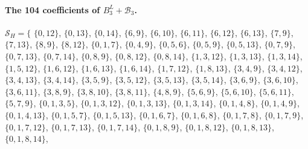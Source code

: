 \paragraph{The 104 coefficients of $B_3^L+\mathcal B_3$.}
\begingroup\small\raggedright
\noindent\(\mathcal S_H=\{\)
\(\{0,12\}\),\allowbreak\space
\(\{0,13\}\),\allowbreak\space
\(\{0,14\}\),\allowbreak\space
\(\{6,9\}\),\allowbreak\space
\(\{6,10\}\),\allowbreak\space
\(\{6,11\}\),\allowbreak\space
\(\{6,12\}\),\allowbreak\space
\(\{6,13\}\),\allowbreak\space
\(\{7,9\}\),\allowbreak\space
\(\{7,13\}\),\allowbreak\space
\(\{8,9\}\),\allowbreak\space
\(\{8,12\}\),\allowbreak\space
\(\{0,1,7\}\),\allowbreak\space
\(\{0,4,9\}\),\allowbreak\space
\(\{0,5,6\}\),\allowbreak\space
\(\{0,5,9\}\),\allowbreak\space
\(\{0,5,13\}\),\allowbreak\space
\(\{0,7,9\}\),\allowbreak\space
\(\{0,7,13\}\),\allowbreak\space
\(\{0,7,14\}\),\allowbreak\space
\(\{0,8,9\}\),\allowbreak\space
\(\{0,8,12\}\),\allowbreak\space
\(\{0,8,14\}\),\allowbreak\space
\(\{1,3,12\}\),\allowbreak\space
\(\{1,3,13\}\),\allowbreak\space
\(\{1,3,14\}\),\allowbreak\space
\(\{1,5,12\}\),\allowbreak\space
\(\{1,6,12\}\),\allowbreak\space
\(\{1,6,13\}\),\allowbreak\space
\(\{1,6,14\}\),\allowbreak\space
\(\{1,7,12\}\),\allowbreak\space
\(\{1,8,13\}\),\allowbreak\space
\(\{3,4,9\}\),\allowbreak\space
\(\{3,4,12\}\),\allowbreak\space
\(\{3,4,13\}\),\allowbreak\space
\(\{3,4,14\}\),\allowbreak\space
\(\{3,5,9\}\),\allowbreak\space
\(\{3,5,12\}\),\allowbreak\space
\(\{3,5,13\}\),\allowbreak\space
\(\{3,5,14\}\),\allowbreak\space
\(\{3,6,9\}\),\allowbreak\space
\(\{3,6,10\}\),\allowbreak\space
\(\{3,6,11\}\),\allowbreak\space
\(\{3,8,9\}\),\allowbreak\space
\(\{3,8,10\}\),\allowbreak\space
\(\{3,8,11\}\),\allowbreak\space
\(\{4,8,9\}\),\allowbreak\space
\(\{5,6,9\}\),\allowbreak\space
\(\{5,6,10\}\),\allowbreak\space
\(\{5,6,11\}\),\allowbreak\space
\(\{5,7,9\}\),\allowbreak\space
\(\{0,1,3,5\}\),\allowbreak\space
\(\{0,1,3,12\}\),\allowbreak\space
\(\{0,1,3,13\}\),\allowbreak\space
\(\{0,1,3,14\}\),\allowbreak\space
\(\{0,1,4,8\}\),\allowbreak\space
\(\{0,1,4,9\}\),\allowbreak\space
\(\{0,1,4,13\}\),\allowbreak\space
\(\{0,1,5,7\}\),\allowbreak\space
\(\{0,1,5,13\}\),\allowbreak\space
\(\{0,1,6,7\}\),\allowbreak\space
\(\{0,1,6,8\}\),\allowbreak\space
\(\{0,1,7,8\}\),\allowbreak\space
\(\{0,1,7,9\}\),\allowbreak\space
\(\{0,1,7,12\}\),\allowbreak\space
\(\{0,1,7,13\}\),\allowbreak\space
\(\{0,1,7,14\}\),\allowbreak\space
\(\{0,1,8,9\}\),\allowbreak\space
\(\{0,1,8,12\}\),\allowbreak\space
\(\{0,1,8,13\}\),\allowbreak\space
\(\{0,1,8,14\}\),\allowbreak\space

